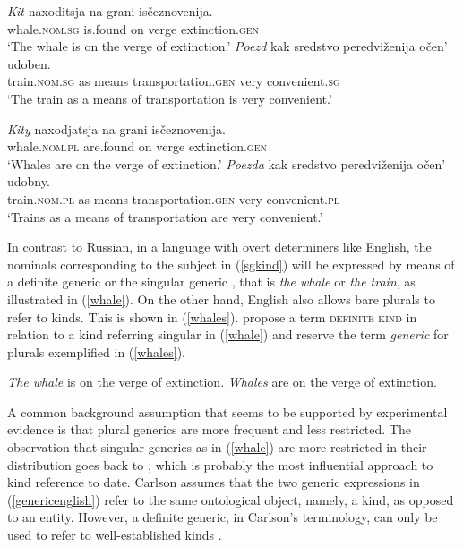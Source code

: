 \documentclass[output=paper,colorlinks,citecolor=brown]{langscibook}
\begin{document}
\ea \label{sgkind}
\ea 
\gll\textit{Kit}  naxoditsja	na 	grani  	is\v{c}eznovenija. \label{kit} \\
whale.\textsc{nom.sg} is.found 	on 	verge 	extinction.\textsc{gen} \\
\glt`The whale is on the verge of extinction.'
\ex
\gll \textit{Poezd} kak 	sredstvo 	peredvi\v{z}enija 			o\v{c}en'	udoben. \label{poezd} \\
train.\textsc{nom.sg} 	as 		means 			transportation.\textsc{gen} very 		convenient.\textsc{sg} \\
\glt `The train as a means of transportation is very convenient.'
\z
\z

\ea \label{plkind}
\ea 
\gll \textit{Kity}  	naxodjatsja		na 	grani  	is\v{c}eznovenija. \\
whale.\textsc{nom.pl}  	are.found 			on 	verge 	extinction.\textsc{gen} \\ 
\glt `Whales are on the verge of extinction.'
\ex 
\gll \textit{Poezda} kak 	sredstvo 	peredvi\v{z}enija 			o\v{c}en' 	udobny. \label{poezda} \\
train.\textsc{nom.pl} 	as 		means 			transportation.\textsc{gen} very 		convenient.\textsc{pl} \\
\glt`Trains as a means of transportation are very convenient.'
\z
\z

\noindent In contrast to Russian, in a language with overt determiners like English, the nominals corresponding to the subject in (\ref{sgkind}) will be expressed by means of a definite generic \citep[cf.][]{carlson77} or the singular generic \citep[cf.][]{chierchia98}, that is \textit{the whale} or \textit{the train}, as illustrated in (\ref{whale}). On the other hand, English also allows bare plurals to refer to kinds. This is shown in (\ref{whales}). \citet{borikespinal15} propose a term \textsc{definite kind} in relation to a kind referring singular in (\ref{whale}) and reserve the term \textit{generic} for plurals exemplified in (\ref{whales}). 

\ea \label{genericenglish}
\ea\textit{The whale} is on the verge of extinction.\label{whale}
\ex \textit{Whales} are on the verge of extinction. \label{whales}
\z
\z

\noindent A common background assumption that seems to be supported by experimental evidence \citep[see][]{ioninetal11} is that plural generics are more frequent and less restricted. The observation that singular generics as in (\ref{whale}) are more restricted in their distribution goes back to \citet{carlson77}, which is probably the most influential approach to kind reference to date. Carlson assumes that the two generic expressions in (\ref{genericenglish}) refer to the same ontological object, namely, a kind, as opposed to an entity. However, a definite generic, in Carlson's terminology, can only be used to refer to well-established kinds \citep[see also][]{krifkaetal}. 
\end{document}
